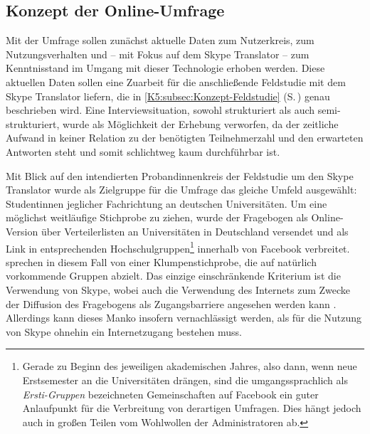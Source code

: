 
\subsection{Konzept der Online-Umfrage}

\label{K5:subsec:Konzept-Umfrage}



Mit der Umfrage sollen zunächst aktuelle Daten zum Nutzerkreis, zum Nutzungsverhalten und -- mit Fokus auf dem Skype Translator -- zum Kenntnisstand im Umgang mit dieser Technologie erhoben werden. Diese aktuellen Daten sollen eine Zuarbeit für die anschließende Feldstudie mit dem Skype Translator liefern, die in \ref{K5:subsec:Konzept-Feldstudie} (S.\,\pageref{K5:subsec:Konzept-Feldstudie}) genau beschrieben wird. Eine Interviewsituation, sowohl strukturiert als auch semi-strukturiert, wurde als Möglichkeit der Erhebung verworfen, da der zeitliche Aufwand in keiner Relation zu der benötigten Teilnehmerzahl und den erwarteten Antworten steht und somit schlichtweg kaum durchführbar ist.

Mit Blick auf den intendierten Proband{\textperiodcentered}innenkreis der Feldstudie um den Skype Translator wurde als Zielgruppe für die Umfrage das gleiche Umfeld ausgewählt: Student{\textperiodcentered}innen jeglicher Fachrichtung an deutschen Universitäten. Um eine möglichst weitläufige Stichprobe zu ziehen, wurde der Fragebogen als Online-Version über Verteilerlisten an Universitäten in Deutschland versendet und als Link in entsprechenden Hochschulgruppen\footnote{Gerade zu Beginn des jeweiligen akademischen Jahres, also dann, wenn neue Erstsemester an die Universitäten drängen, sind die umgangssprachlich als \emph{Ersti-Gruppen} bezeichneten Gemeinschaften auf Facebook ein guter Anlaufpunkt für die Verbreitung von derartigen Umfragen. Dies hängt jedoch auch in großen Teilen vom Wohlwollen der Administratoren ab.} innerhalb von Facebook verbreitet. \citeauthor{aeppli_empirisches_2016} sprechen in diesem Fall von einer Klumpenstichprobe, die auf \glqq natürlich vorkommende Gruppen\grqq{} \citep[174]{aeppli_empirisches_2016} abzielt. Das einzige einschränkende Kriterium ist die Verwendung von Skype, wobei auch die Verwendung des Internets zum Zwecke der Diffusion des Fragebogens als Zugangsbarriere angesehen werden kann \citep[174]{aeppli_empirisches_2016}. Allerdings kann dieses Manko insofern vernachlässigt werden, als für die Nutzung von Skype ohnehin ein Internetzugang bestehen muss.

